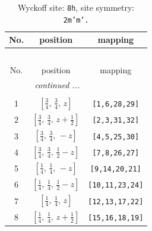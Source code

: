 \documentclass[fleqn,8pt]{jsarticle}
\begin{document}
\begin{longtable}{ccc}
\caption{Wyckoff site: {\tt 8h}, site symmetry: {\tt 2m'm'.}}
 \\
 \hline \hline
No. & position & mapping \\ \hline \endfirsthead

\multicolumn{2}{l}{\tablename\ \thetable{}} \\
 \hline \hline
No. & position & mapping \\ \hline \endhead

 \hline \hline
\multicolumn{2}{r}{\footnotesize\it continued ...} \\ \endfoot

 \hline \hline
\multicolumn{2}{r}{} \\ \endlastfoot

1 & $\left[ \frac{3}{4},\, \frac{3}{4},\, z \right]$ & {\tt [1,6,28,29]} \\ \hline
2 & $\left[ \frac{3}{4},\, \frac{3}{4},\, z + \frac{1}{2} \right]$ & {\tt [2,3,31,32]} \\ \hline
3 & $\left[ \frac{3}{4},\, \frac{3}{4},\, - z \right]$ & {\tt [4,5,25,30]} \\ \hline
4 & $\left[ \frac{3}{4},\, \frac{3}{4},\, \frac{1}{2} - z \right]$ & {\tt [7,8,26,27]} \\ \hline
5 & $\left[ \frac{1}{4},\, \frac{1}{4},\, - z \right]$ & {\tt [9,14,20,21]} \\ \hline
6 & $\left[ \frac{1}{4},\, \frac{1}{4},\, \frac{1}{2} - z \right]$ & {\tt [10,11,23,24]} \\ \hline
7 & $\left[ \frac{1}{4},\, \frac{1}{4},\, z \right]$ & {\tt [12,13,17,22]} \\ \hline
8 & $\left[ \frac{1}{4},\, \frac{1}{4},\, z + \frac{1}{2} \right]$ & {\tt [15,16,18,19]} \\
\end{longtable}
\renewcommand{\arraystretch}{1.2}
\end{document}
